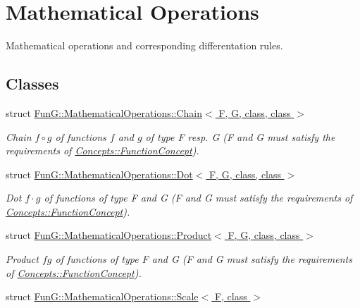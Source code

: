 \hypertarget{group__MathematicalOperationsGroup}{\section{\-Mathematical \-Operations}
\label{group__MathematicalOperationsGroup}
}


\-Mathematical operations and corresponding differentation rules.  


\subsection*{\-Classes}
\begin{DoxyCompactItemize}
\item 
struct \hyperlink{structFunG_1_1MathematicalOperations_1_1Chain}{\-Fun\-G\-::\-Mathematical\-Operations\-::\-Chain$<$ F, G, class, class $>$}
\begin{DoxyCompactList}\small\item\em \-Chain $ f\circ g $ of functions $f$ and $g$ of type \-F resp. \-G (\-F and \-G must satisfy the requirements of \hyperlink{structFunG_1_1Concepts_1_1FunctionConcept}{\-Concepts\-::\-Function\-Concept}). \end{DoxyCompactList}\item 
struct \hyperlink{structFunG_1_1MathematicalOperations_1_1Dot}{\-Fun\-G\-::\-Mathematical\-Operations\-::\-Dot$<$ F, G, class, class $>$}
\begin{DoxyCompactList}\small\item\em \-Dot $f \cdot g$ of functions of type \-F and \-G (\-F and \-G must satisfy the requirements of \hyperlink{structFunG_1_1Concepts_1_1FunctionConcept}{\-Concepts\-::\-Function\-Concept}). \end{DoxyCompactList}\item 
struct \hyperlink{structFunG_1_1MathematicalOperations_1_1Product}{\-Fun\-G\-::\-Mathematical\-Operations\-::\-Product$<$ F, G, class, class $>$}
\begin{DoxyCompactList}\small\item\em \-Product $fg$ of functions of type \-F and \-G (\-F and \-G must satisfy the requirements of \hyperlink{structFunG_1_1Concepts_1_1FunctionConcept}{\-Concepts\-::\-Function\-Concept}). \end{DoxyCompactList}\item 
struct \hyperlink{structFunG_1_1MathematicalOperations_1_1Scale}{\-Fun\-G\-::\-Mathematical\-Operations\-::\-Scale$<$ F, class $>$}

\end{DoxyCompactItemize}
